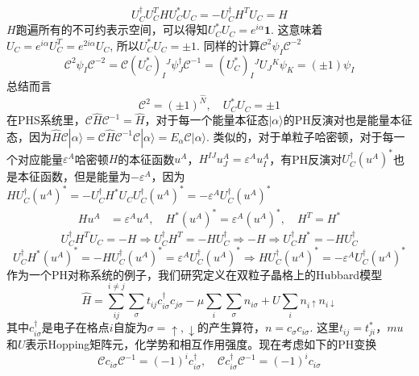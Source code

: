 \documentclass[a4paper]{article}
\numberwithin{equation}{subsection}
\newcommand{\mC}{\mathcal{C}}
\begin{document}
\begin{equation}
    U_C^\dagger U_C^THU_C^*U_C=-U_C^\dagger H^TU_C=H
\end{equation}
$H$跑遍所有的不可约表示空间，可以得知$U_C^*U_C=e^{i\alpha}\mathbf{1}$. 这意味着$U_C=e^{i\alpha}U_C^T=e^{2i\alpha}U_C$, 所以$U_C^*U_C=\pm 1$. 同样的计算$\mC^2\psi_I\mC^{-2}$
\begin{equation}
    \mC^2\psi_I\mC^{-2}=\mC (U_C^*)_I{}^J\psi_J^\dagger\mC^{-1}=(U_C^*)_I{}^JU_J{}^K\psi_K=(\pm 1)\psi_I
\end{equation}
总结而言
\begin{equation}
    \mC^2=(\pm 1)^{\hat{N}},\quad U_C^*U_C=\pm 1
\end{equation}
在PHS系统里，$\mC \hat{H}\mC^{-1}=\hat{H}$，对于每一个能量本征态$|\alpha\rangle$的PH反演对也是能量本征态，因为$\hat{H}\mC|\alpha\rangle=\mC \hat{H}\mC^{-1}\mC|\alpha\rangle=E_\alpha\mC|\alpha\rangle$. 类似的，对于单粒子哈密顿，对于每一个对应能量$\varepsilon^A$哈密顿$H$的本征函数$u^A$，$H^{IJ}u^A_J=\varepsilon^A u_{I}^{A}$，有PH反演对$U_C^\dagger (u^A)^*$也是本征函数，但是能量为$-\varepsilon^A$，因为$HU_C^\dagger(u^A)^*=-U_C^\dagger H^*U_CU_C^\dagger (u^A)^*=-\varepsilon^AU_C^\dagger(u^A)^*$
\begin{equation}
    \begin{split}
        Hu^A&=\varepsilon^Au^A,\quad H^*(u^A)^*=\varepsilon^A (u^A)^*,\quad H^T=H^*
    \end{split}
\end{equation}
\begin{equation}
    U_C^\dagger H^TU_C=-H\Rightarrow U_C^\dagger H^T=-HU_C^\dagger\Rightarrow-H\Rightarrow U_C^\dagger H^*=-HU_C^\dagger
\end{equation}
\begin{equation}
    U_C^\dagger H^*(u^A)^*=-HU_C^\dagger (u^A)^*=\varepsilon^A U_C^\dagger(u^A)^*\Rightarrow HU_C^\dagger (u^A)^*=-\varepsilon^AU_C^\dagger(u^A)^*
\end{equation}
作为一个PH对称系统的例子，我们研究定义在双粒子晶格上的Hubbard模型
\begin{equation}
    \hat{H}=\sum_{ij}^{i\neq j}\sum_{\sigma}t_{ij}c_{i\sigma}^\dagger c_{j\sigma}-\mu\sum_{i}\sum_{\sigma}n_{i\sigma}+U\sum_{i}n_{i\uparrow}n_{i\downarrow}
\end{equation}
其中$c_{i\sigma}^\dagger$是电子在格点$i$自旋为$\sigma=\uparrow,\downarrow$的产生算符，$n=c_{\sigma}c_{i\sigma}$. 这里$t_{ij}=t_{ji}^*$，$mu$和$U$表示Hopping矩阵元，化学势和相互作用强度。现在考虑如下的PH变换
\begin{equation}
    \mC c_{i\sigma}\mC^{-1}=(-1)^{i}c_{i\sigma}^\dagger,\quad \mC c_{i\sigma}^\dagger\mC^{-1}=(-1)^{i}c_{i\sigma}
\end{equation}
\end{document}
